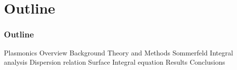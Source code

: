 \documentclass[mathserif,16pt,xcolor=table]{beamer}
\begin{document}
\section{Outline}
\begin{frame}
  \frametitle{Outline}
  \begin{outline}[itemize]
    \1 Plasmonics Overview
    \1 Background
    \1 Theory and Methods
      \2 Sommerfeld Integral analysis
      \2 Dispersion relation
      \2 Surface Integral equation
    \1 Results
    \1 Conclusions
  \end{outline}
\end{frame}
\end{document}
